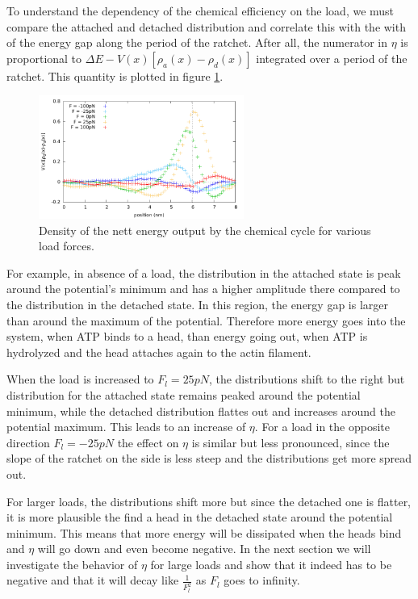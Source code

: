 \documentclass[aps,pre,onecolumn,showpacs,showkeys,a4paper]{revtex4}
\begin{document}
To understand the dependency of the chemical efficiency on the load, we must compare the attached and detached distribution and correlate this with the with of the energy gap along the period of the ratchet. 
After all, the numerator in $\eta$ is proportional to $\Delta E - V(x)\left[\rho_a(x) - \rho_d(x)\right]$ integrated over a period of the ratchet. This quantity is plotted in figure \ref{Fig: chem_energy_distr}.\par
\begin{figure}[h]
\centering
\includegraphics[width=0.6\textwidth,height=!]{chem_energy_distr_all_F}
\caption{Density of the nett energy output by the chemical cycle for various load forces.}
\label{Fig: chem_energy_distr}
\end{figure}
For example, in absence of a load, the distribution in the attached state is peak around the potential's minimum and has a higher amplitude there compared to the distribution in the detached state. In this region, the energy gap is larger than around the maximum of the potential. Therefore more energy goes into the system, when ATP binds to a head, than energy going out, when ATP is hydrolyzed and the head attaches again to the actin filament. \par 
When the load is increased to $F_l= 25 pN$, the distributions shift to the right but distribution for the attached state remains peaked around the potential minimum, while the detached distribution flattes out and increases around the potential maximum. This leads to an increase of $\eta$. For a load in the opposite direction $F_l = -25 pN$ the effect on $\eta$ is similar but less pronounced, since the slope of the ratchet on the side is less steep and the distributions get more spread out. \par
For larger loads, the distributions shift more but since the detached one is flatter, it is more plausible the find a head in the detached state around the potential minimum. This means that more energy will be dissipated when the heads bind and $\eta$ will go down and even become negative. In the next section we will investigate the behavior of $\eta$ for large loads and show that it indeed has to be negative and that it will decay like $\frac{1}{F_l^2}$ as $F_l$ goes to infinity.
\end{document}

